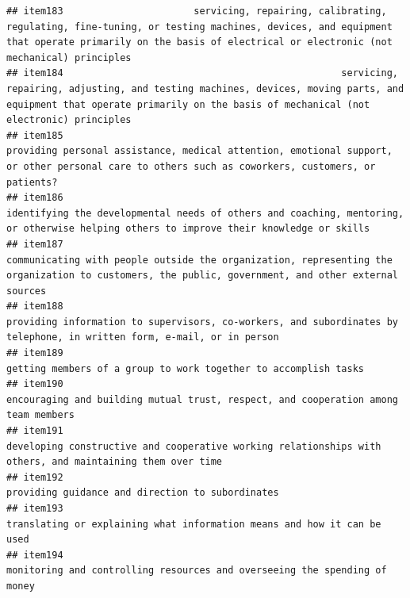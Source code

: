 \documentclass[
  man]{apa6}
\begin{document}
\begin{verbatim}
## item183                       servicing, repairing, calibrating, regulating, fine-tuning, or testing machines, devices, and equipment that operate primarily on the basis of electrical or electronic (not mechanical) principles
## item184                                                 servicing, repairing, adjusting, and testing machines, devices, moving parts, and equipment that operate primarily on the basis of mechanical (not electronic) principles
## item185                                                                          providing personal assistance, medical attention, emotional support, or other personal care to others such as coworkers, customers, or patients?
## item186                                                                                   identifying the developmental needs of others and coaching, mentoring, or otherwise helping others to improve their knowledge or skills
## item187                                                                        communicating with people outside the organization, representing the organization to customers, the public, government, and other external sources
## item188                                                                                                    providing information to supervisors, co-workers, and subordinates by telephone, in written form, e-mail, or in person
## item189                                                                                                                                                           getting members of a group to work together to accomplish tasks
## item190                                                                                                                                        encouraging and building mutual trust, respect, and cooperation among team members
## item191                                                                                                                 developing constructive and cooperative working relationships with others, and maintaining them over time
## item192                                                                                                                                                                          providing guidance and direction to subordinates
## item193                                                                                                                                                   translating or explaining what information means and how it can be used
## item194                                                                                                                                                 monitoring and controlling resources and overseeing the spending of money

\end{verbatim}
\end{document}
